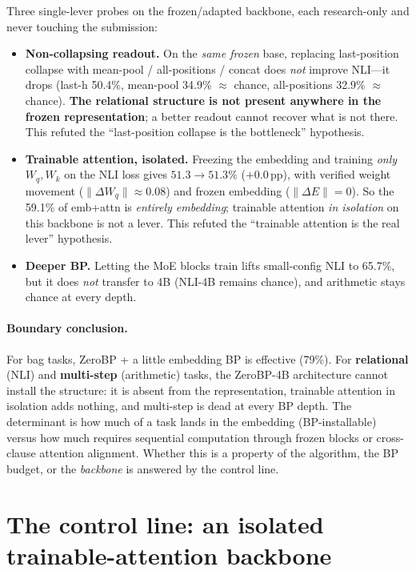 \documentclass[11pt]{article}
\newcommand{\zbp}{ZeroBP-4B}
\begin{document}
Three single-lever probes on the frozen/adapted backbone, each research-only and never touching the
submission:
\begin{itemize}
\item \textbf{Non-collapsing readout.} On the \emph{same frozen} base, replacing last-position collapse with
mean-pool / all-positions / concat does \emph{not} improve NLI---it drops (last-h 50.4\%, mean-pool 34.9\%
$\approx$ chance, all-positions 32.9\% $\approx$ chance). \textbf{The relational structure is not present
anywhere in the frozen representation}; a better readout cannot recover what is not there. This refuted the
``last-position collapse is the bottleneck'' hypothesis.
\item \textbf{Trainable attention, isolated.} Freezing the embedding and training \emph{only} $W_q,W_k$ on
the NLI loss gives $51.3 \to 51.3\%$ ($+0.0$\,pp), with verified weight movement
($\lVert \Delta W_q \rVert \approx 0.08$) and frozen embedding ($\lVert \Delta E \rVert = 0$). So the 59.1\%
of emb+attn is \emph{entirely embedding}; trainable attention \emph{in isolation} on this backbone is not a
lever. This refuted the ``trainable attention is the real lever'' hypothesis.
\item \textbf{Deeper BP.} Letting the MoE blocks train lifts small-config NLI to 65.7\%, but it does
\emph{not} transfer to 4B (NLI-4B remains chance), and arithmetic stays chance at every depth.
\end{itemize}

\paragraph{Boundary conclusion.} For bag tasks, ZeroBP + a little embedding BP is effective (79\%). For
\textbf{relational} (NLI) and \textbf{multi-step} (arithmetic) tasks, the \zbp{} architecture cannot install
the structure: it is absent from the representation, trainable attention in isolation adds nothing, and
multi-step is dead at every BP depth. The determinant is how much of a task lands in the embedding
(BP-installable) versus how much requires sequential computation through frozen blocks or cross-clause
attention alignment. Whether this is a property of the algorithm, the BP budget, or the \emph{backbone} is
answered by the control line.

\section{The control line: an isolated trainable-attention backbone}
\label{sec:control}
\end{document}

